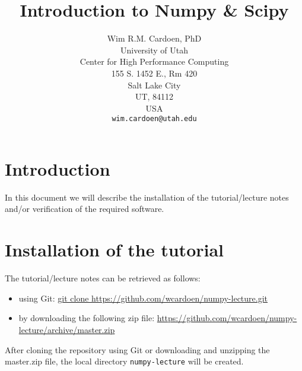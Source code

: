 \documentclass[11pt]{article}
\begin{document}
\title{Introduction to Numpy \& Scipy}
\author{Wim R.M. Cardoen, PhD\\
        University of Utah\\
        Center for High Performance Computing\\
        155 S. 1452 E., Rm 420\\
        Salt Lake City\\
        UT, 84112\\
        USA\\
        \texttt{wim.cardoen@utah.edu}}
\renewcommand{\today}{Aug. 7, 2018}
\renewcommand{\labelitemii}{$\star$}
\maketitle

\section*{Introduction}
In this document we will describe the installation of the tutorial/lecture notes 
and/or verification of the required software.

\renewcommand \thesection{\Roman{section}}
\section{Installation of the tutorial}
The tutorial/lecture notes can be retrieved as follows:
\begin{itemize}
\item using Git:\newline
      \href{git clone https://github.com/wcardoen/numpy-lecture.git}{git clone https://github.com/wcardoen/numpy-lecture.git}
\item by downloading the following zip file:\newline
   \href{https://github.com/wcardoen/numpy-lecture/archive/master.zip}{https://github.com/wcardoen/numpy-lecture/archive/master.zip}
\end{itemize}
After cloning the repository using Git or downloading and unzipping the master.zip file, 
the local directory \texttt{numpy-lecture} will be created.
\end{document}
